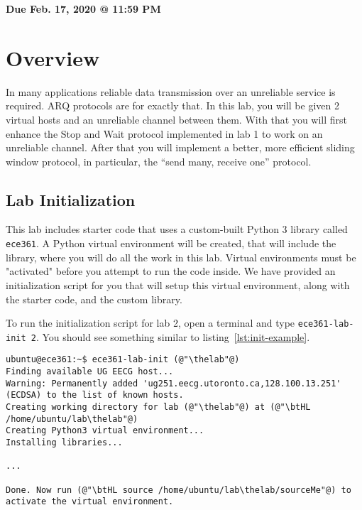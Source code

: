 \documentclass[11pt]{article}
\makeatletter
\def\thelab{2}
\def\datedue{Feb. 17, 2020 @ 11:59 PM}
\makeatother
\begin{document}
\maketitle \thispagestyle{fancy}
\hfill {\large \textbf{Due \datedue}}


\section{Overview}
\label{sec:overview}
In many applications reliable data transmission over an unreliable service is required. ARQ protocols are for exactly that. In this lab, you will be given 2 virtual hosts and an unreliable channel between them. With that you will first enhance the Stop and Wait protocol implemented in lab 1 to work on an unreliable channel. After that you will implement a better, more efficient sliding window protocol, in particular, the ``send many, receive one'' protocol.

\subsection{Lab Initialization}
\label{subsec:lab-init}
This lab includes starter code that uses a custom-built Python 3 library called \texttt{ece361}. A Python virtual environment will be created, that will include the library, where you will do all the work in this lab. Virtual environments must be "activated" before you attempt to run the code inside. We have provided an initialization script for you that will setup this virtual environment, along with the starter code, and the custom library.


To run the initialization script for lab \thelab, open a terminal and type \texttt{ece361-lab-init \thelab}. You should see something similar to listing~\ref{lst:init-example}.
\begin{lstlisting}[style=ece361shell, caption={Initializing lab \thelab.}, label={lst:init-example}]
ubuntu@ece361:~$ ece361-lab-init (@"\thelab"@)
Finding available UG EECG host...
Warning: Permanently added 'ug251.eecg.utoronto.ca,128.100.13.251' (ECDSA) to the list of known hosts.
Creating working directory for lab (@"\thelab"@) at (@"\btHL /home/ubuntu/lab\thelab"@)
Creating Python3 virtual environment...
Installing libraries...

...

Done. Now run (@"\btHL source /home/ubuntu/lab\thelab/sourceMe"@) to activate the virtual environment.
\end{lstlisting}
\end{document}
